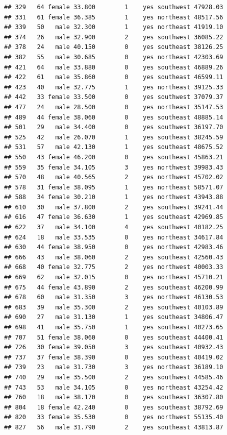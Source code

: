 \documentclass[
]{article}
\begin{document}
\begin{verbatim}
## 329   64 female 33.800        1    yes southwest 47928.03
## 331   61 female 36.385        1    yes northeast 48517.56
## 339   50   male 32.300        1    yes northeast 41919.10
## 374   26   male 32.900        2    yes southwest 36085.22
## 378   24   male 40.150        0    yes southeast 38126.25
## 382   55   male 30.685        0    yes northeast 42303.69
## 421   64   male 33.880        0    yes southeast 46889.26
## 422   61   male 35.860        0    yes southeast 46599.11
## 423   40   male 32.775        1    yes northeast 39125.33
## 442   33 female 33.500        0    yes southwest 37079.37
## 477   24   male 28.500        0    yes northeast 35147.53
## 489   44 female 38.060        0    yes southeast 48885.14
## 501   29   male 34.400        0    yes southwest 36197.70
## 525   42   male 26.070        1    yes southeast 38245.59
## 531   57   male 42.130        1    yes southeast 48675.52
## 550   43 female 46.200        0    yes southeast 45863.21
## 559   35 female 34.105        3    yes northwest 39983.43
## 570   48   male 40.565        2    yes northwest 45702.02
## 578   31 female 38.095        1    yes northeast 58571.07
## 588   34 female 30.210        1    yes northwest 43943.88
## 610   30   male 37.800        2    yes southwest 39241.44
## 616   47 female 36.630        1    yes southeast 42969.85
## 622   37   male 34.100        4    yes southwest 40182.25
## 624   18   male 33.535        0    yes northeast 34617.84
## 630   44 female 38.950        0    yes northwest 42983.46
## 666   43   male 38.060        2    yes southeast 42560.43
## 668   40 female 32.775        2    yes northwest 40003.33
## 669   62   male 32.015        0    yes northeast 45710.21
## 675   44 female 43.890        2    yes southeast 46200.99
## 678   60   male 31.350        3    yes northwest 46130.53
## 683   39   male 35.300        2    yes southwest 40103.89
## 690   27   male 31.130        1    yes southeast 34806.47
## 698   41   male 35.750        1    yes southeast 40273.65
## 707   51 female 38.060        0    yes southeast 44400.41
## 726   30 female 39.050        3    yes southeast 40932.43
## 737   37 female 38.390        0    yes southeast 40419.02
## 739   23   male 31.730        3    yes northeast 36189.10
## 740   29   male 35.500        2    yes southwest 44585.46
## 743   53   male 34.105        0    yes northeast 43254.42
## 760   18   male 38.170        0    yes southeast 36307.80
## 804   18 female 42.240        0    yes southeast 38792.69
## 820   33 female 35.530        0    yes northwest 55135.40
## 827   56   male 31.790        2    yes southeast 43813.87

\end{verbatim}
\end{document}
